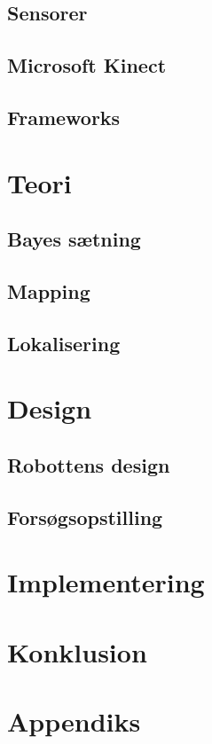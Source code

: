 \chapter{Sensorer}

\chapter{Microsoft Kinect}

\chapter{Frameworks}



\clearpage


\part{Teori}
\chapter{Bayes sætning}

\chapter{Mapping}


\chapter{Lokalisering}


\part{Design}
\chapter{Robottens design}


\chapter{Forsøgsopstilling}

\part{Implementering}

\part{Konklusion}

\appendix
\part{Appendiks}



